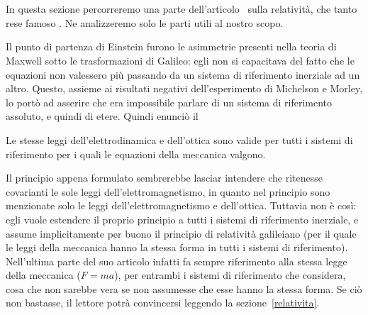 \chapter{\ein \label{sez_ein}}
\minitoc
In questa sezione percorreremo una parte dell'articolo~\cite{alberto}
sulla relativit\`a, che tanto rese famoso \ein. Ne analizzeremo solo
le parti utili al nostro scopo.

Il punto di partenza di Einstein furono le asimmetrie presenti nella
teoria di Maxwell sotto le trasformazioni di Galileo: egli non si
capacitava del fatto che le equazioni non valessero pi\`u passando da un
sistema di riferimento inerziale ad un altro. Questo, assieme ai
risultati negativi dell'esperimento di Michelson e Morley, lo port\`o ad
asserire che era impossibile parlare di un sistema di riferimento
assoluto, e quindi di etere. Quindi enunci\`o il
\begin{principio}
  Le stesse leggi dell'elettrodinamica e dell'ottica sono valide per
  tutti i sistemi di riferimento per i quali le equazioni della
  meccanica valgono.
\end{principio}
\begin{observazione}
  Il principio appena formulato sembrerebbe lasciar intendere che \ein{}
  ritenesse covarianti le sole leggi dell'elettromagnetismo, in quanto
  nel principio sono menzionate solo le leggi dell'elettromagnetismo e
  dell'ottica. Tuttavia non \`e cos\`i: egli vuole estendere il proprio
  principio a tutti i sistemi di riferimento inerziale, e assume
  implicitamente per buono il principio di relativit\`a galileiano (per
  il quale le leggi della meccanica hanno la stessa forma in tutti i
  sistemi di riferimento). Nell'ultima parte del suo articolo infatti fa
  sempre riferimento alla stessa legge della meccanica ($F = ma$), per
  entrambi i sistemi di riferimento che considera, cosa che non sarebbe
  vera se non assumesse che esse hanno la stessa forma. Se ci\`o non
  bastasse, il lettore potr\`a convincersi leggendo la
  sezione~\ref{relativita}.
\end{observazione}
%

